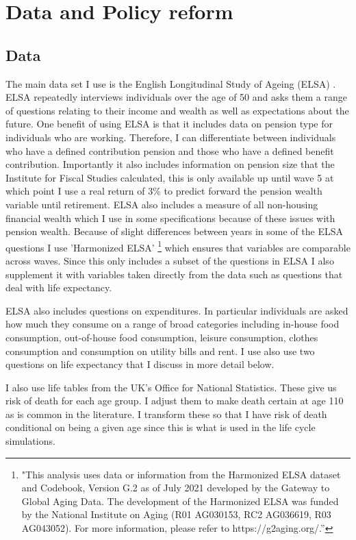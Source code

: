 \documentclass[12pt]{article}
\begin{document}
\section{Data and Policy reform}

\subsection{Data}

The main data set I use is the English Longitudinal Study of Ageing (ELSA) \cite{main_elsa_citation}. ELSA repeatedly interviews
individuals over the age of 50 and asks them a range of questions relating to their income and wealth as well as expectations about
the future. One benefit of using ELSA is that it includes data on pension type for individuals who are working. Therefore,
I can differentiate between individuals who have a defined contribution pension and those who have a defined benefit contribution.
Importantly it also includes information on pension size that the Institute for Fiscal Studies calculated, this is only available
up until wave 5 at which point I use a real return of 3\% to predict forward the pension wealth variable until retirement.
ELSA also includes a measure of all non-housing financial wealth which I use in some specifications because of these issues with
pension wealth. Because of slight differences between years in some of the ELSA questions I use 'Harmonized ELSA'
\footnote{"This analysis uses data or information from the Harmonized ELSA dataset and Codebook, Version G.2 as of
    July 2021 developed by the Gateway to Global Aging Data. The development of the Harmonized ELSA was funded by the National
    Institute on Aging (R01 AG030153, RC2 AG036619, R03 AG043052). For more information,
    please refer to https://g2aging.org/.”} which ensures that variables are comparable across waves. Since this only includes a
subset of the questions in ELSA I also supplement it with variables taken directly from the data such as questions that deal
with life expectancy.

ELSA also includes questions on expenditures. In particular individuals are asked how much they consume on a range of broad
categories including in-house food consumption, out-of-house food consumption, leisure consumption, clothes consumption and
consumption on utility bills and rent. I use also use two questions on life expectancy that I discuss in more detail below.

I also use life tables from the UK's Office for National Statistics. These give us risk of death for each age group. I adjust them
to make death certain at age 110 as is common in the literature. I transform these so that I have risk of death conditional on being
a given age since this is what is used in the life cycle simulations.
\end{document}
